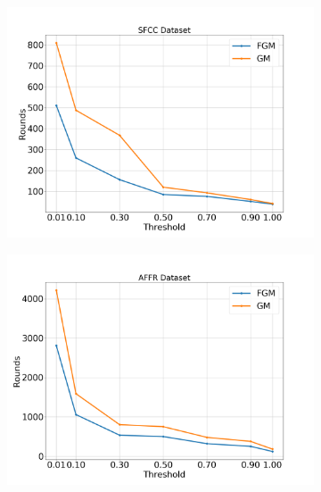 \begin{figure}[H]
\begin{subfigure}[b]{0.45\textwidth}
        \includegraphics[width=\textwidth]{./images/results/sfc-plots/exp_Fig_1_2.png}
        \caption{}
    \end{subfigure}
    \hfill
    \begin{subfigure}[b]{0.45\textwidth}
        \centering
        \includegraphics[width=\textwidth]{./images/results/amazon-plots/exp_Fig_1_2.png}
        \caption{}
    \end{subfigure}
    \begin{subfigure}[b]{0.45\textwidth}
        \centering

\end{subfigure}
\end{figure}

